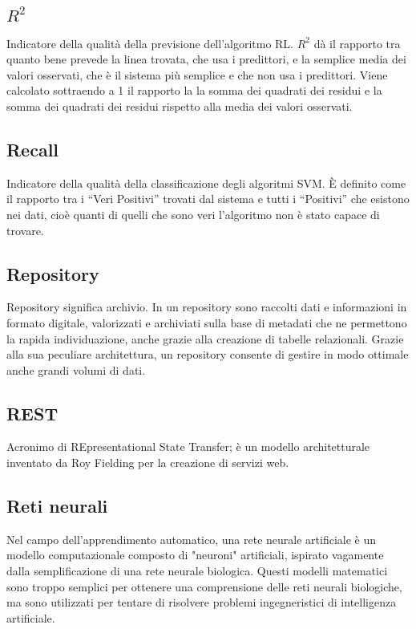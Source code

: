 \subsection*{$R^{2}$}
Indicatore della qualità della previsione dell'algoritmo RL\glo. $R^{2}$ dà il rapporto tra quanto bene prevede la linea trovata, che usa i predittori\glo, e la semplice media dei valori osservati, che è il sistema più semplice e che non usa i predittori\glo. Viene calcolato sottraendo a 1 il rapporto la la somma dei quadrati dei residui e la somma dei quadrati dei residui rispetto alla media dei valori osservati.

\subsection*{Recall}
Indicatore della qualità della classificazione degli algoritmi SVM\glo. È definito come il rapporto tra i “Veri Positivi” trovati dal sistema e tutti i “Positivi” che esistono nei dati, cioè quanti di quelli che sono veri l'algoritmo non è stato capace di trovare.

\subsection*{Repository}
Repository significa archivio. In un repository sono raccolti dati e informazioni in formato digitale, valorizzati e archiviati sulla base di metadati che ne permettono la rapida individuazione, anche grazie alla creazione di tabelle relazionali. Grazie alla sua peculiare architettura, un repository consente di gestire in modo ottimale anche grandi volumi di dati.

\subsection*{REST}
Acronimo di REpresentational State Transfer; è un modello architetturale inventato da Roy Fielding per la creazione di servizi web.

\subsection*{Reti neurali}
Nel campo dell'apprendimento automatico, una rete neurale artificiale  è un modello computazionale composto di "neuroni" artificiali, ispirato vagamente dalla semplificazione di una rete neurale biologica. Questi modelli matematici sono troppo semplici per ottenere una comprensione delle reti neurali biologiche, ma sono utilizzati per tentare di risolvere problemi ingegneristici di intelligenza artificiale.


